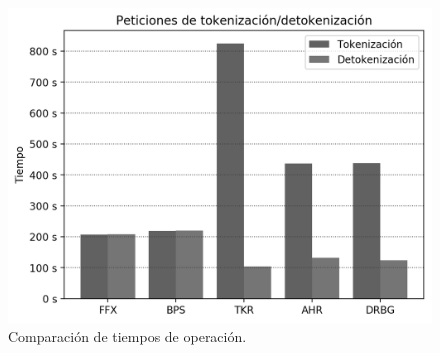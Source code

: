\begin{figure}
  \begin{center}
    \includegraphics[width=0.7\linewidth]
      {diagramas/peticiones_tokenizacion_grafica}
  \end{center}
  \caption{Comparación de tiempos de operación.}
  \label{figura:peticiones_tokenizacion_grafica}
\end{figure}
